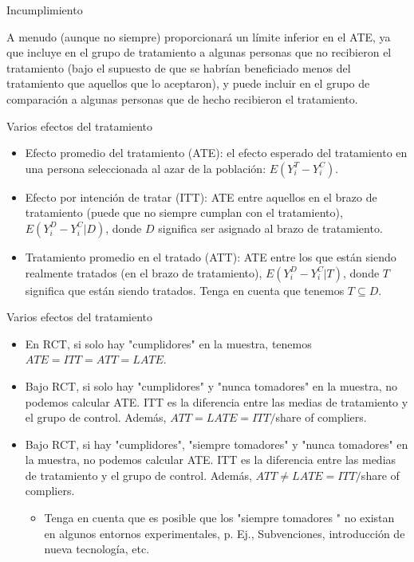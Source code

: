 \documentclass[11pt, aspectratio=169, compress]{beamer}
\begin{document}
\begin{frame}{Incumplimiento}
  
  A menudo (aunque no siempre) proporcionará un límite inferior en el ATE, ya que incluye en el grupo de tratamiento a algunas personas que no recibieron el tratamiento (bajo el supuesto de que se habrían beneficiado menos del tratamiento que aquellos que lo aceptaron), y puede incluir en el grupo de comparación a algunas personas que de hecho recibieron el tratamiento.
  
\end{frame}
\begin{frame}{Varios efectos del tratamiento}
	\begin{itemize}
		\item Efecto promedio del tratamiento (ATE): el efecto esperado del tratamiento en una persona seleccionada al azar de la población: $E(Y_{i}^{T}-Y_{i}^{C})$. 
		\item Efecto por intención de tratar (ITT): ATE entre aquellos en el brazo de tratamiento (puede que no siempre cumplan con el tratamiento), $E(Y_{i}^{D} - Y_{i}^{C}| D)$, donde $D$ significa ser asignado al brazo de tratamiento.
		\item Tratamiento promedio en el tratado (ATT): ATE entre los que están siendo realmente tratados (en el brazo de tratamiento), $E(Y_{i}^{D} - Y_{i}^{C}| T)$, donde $T$ significa que están siendo tratados. Tenga en cuenta que tenemos $ T \subseteq D$.
	\end{itemize}
\end{frame}
\begin{frame}{Varios efectos del tratamiento}
	\begin{itemize}
		\item En RCT, si solo hay "cumplidores" en la muestra, tenemos $ATE = ITT = ATT = LATE$. 
		\item Bajo RCT, si solo hay "cumplidores" y "nunca tomadores" en la muestra, no podemos calcular ATE. ITT es la diferencia entre las medias de tratamiento y el grupo de control. Además, $ ATT = LATE = ITT/$share of compliers.
		\item Bajo RCT, si hay "cumplidores", "siempre tomadores" y "nunca tomadores" en la muestra, no podemos calcular ATE. ITT es la diferencia entre las medias de tratamiento y el grupo de control. Además, $ ATT \neq LATE = ITT/$share of compliers.
		\begin{itemize}
			\item Tenga en cuenta que es posible que los "siempre tomadores " no existan en algunos entornos experimentales, p. Ej., Subvenciones, introducción de nueva tecnología, etc.
		\end{itemize}
	\end{itemize}
\end{frame}
\end{document}
